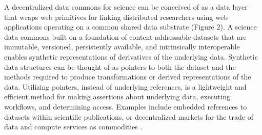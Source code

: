 \documentclass[conference]{IEEEtran}
\begin{document}
A decentralized data commons for science can be conceived of as a data layer that wraps web primitives for linking distributed researchers using web applications operating on a common shared data substrate  (Figure 2). A science data commons built on a foundation of content addressable datasets that are immutable, versioned, persistently available, and intrinsically interoperable enables synthetic representations of derivatives of the underlying data. Synthetic data structures can be thought of as pointers to both the dataset and the methods required to produce transformations or derived representations of the data. Utilizing pointers, instead of underlying references, is a lightweight and efficient method for making assertions about underlying data, executing workflows, and determining access. Examples include embedded references to datasets within scientific publications, or decentralized markets for the trade of data and compute services as commodities \cite{ocean-protocol}. 
\end{document}
